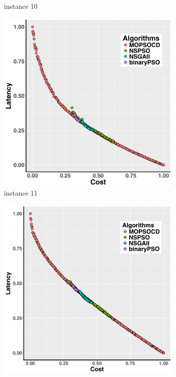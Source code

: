 \documentclass[10pt,journal,compsoc]{IEEEtran}
\begin{document}
\begin{figure}[ht]
\begin{subfigure}{0.21\linewidth}
    \caption{instance 10}
   \end{subfigure}
   \begin{subfigure}{0.21\linewidth}
       \includegraphics[width=\textwidth]{pics/total11.png}
    \caption{instance 11}
   \end{subfigure}
   \begin{subfigure}{0.21\linewidth}
       \includegraphics[width=\textwidth]{pics/total12.png}

\end{subfigure}
\end{figure}
\end{document}

